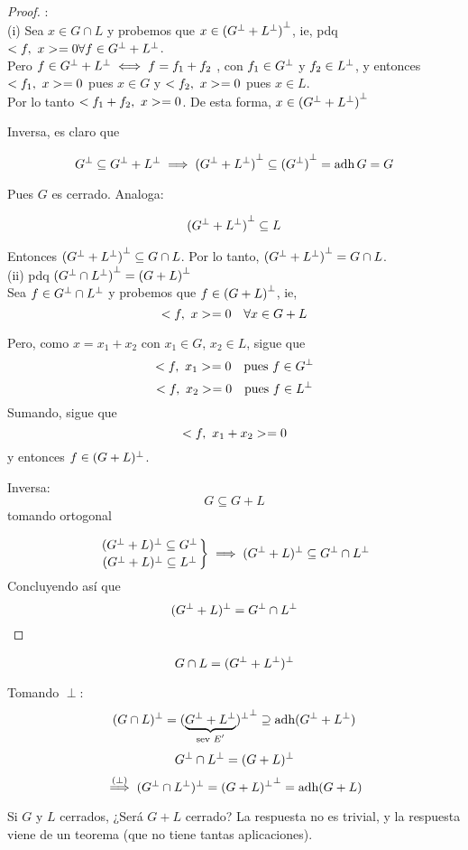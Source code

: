 \begin{proof}: \\ 
(i) Sea $x \in G \cap L$ y probemos que $x \in {(G^{\perp}+ L^{\perp})}^{\perp}$, ie, pdq $<f, \ x>_{} = 0 \forall f \in G^{\perp} + L^{\perp}$.\\ 
Pero $f \in G^{\perp} + L^{\perp} \iff f = f_1 + f_2$ , con $f_1 \in G^{\perp}$ y $f_2 \in L^{\perp}$, y entonces $<f_1, \ x>_{} = 0$ pues $x \in G$ y $<f_2, \ x>_{} = 0$ pues $x \in L$.\\
Por lo tanto $<f_1 + f_2, \ x>_{} = 0$. De esta forma, $x \in {(G^{\perp}+ L^{\perp})}^{\perp}$

Inversa\mte, es claro que

$$G^{\perp} \subseteq G^{\perp} + L^{\perp} \implies {(G^{\perp}+ L^{\perp})}^{\perp} \subseteq {(G^{\perp})}^{\perp} = \operatorname{\mathop{\text{\upshape{adh}}}} G = G$$

Pues $G$ es cerrado. Analoga\mte:

$${(G^{\perp} + L^{\perp})}^{\perp} \subseteq L $$

Entonces ${(G^{\perp} + L^{\perp})}^{\perp} \subseteq G \cap L $. Por lo tanto, ${(G^{\perp} + L^{\perp})}^{\perp} = G \cap L $. \\

(ii) pdq ${(G^{\perp} \cap L^{\perp})}^{\perp} = {(G + L)}^{\perp}$\\
Sea $f \in G^{\perp} \cap L^{\perp}$ y probemos que $f \in {(G + L)}^{\perp}$, ie, $$ <f, \ x>_{} = 0 \quad \forall x \in G + L $$

Pero, como $x = x_1 + x_2$ con $ x_1 \in G $, $ x_2 \in L $, sigue que $$ <f, \ x_1>_{} = 0 \quad \text{pues $f\in G^{\perp}$}$$ $$ <f, \ x_2>_{} = 0 \quad \text{pues $f\in L^{\perp}$}$$ Sumando, sigue que $$ <f, \ x_1 + x_2>_{} = 0 $$ y entonces $f \in (G + L)^{\perp}$.

Inversa\mte: 
$$ G \subseteq G + L $$ tomando ortogonal 

$$\left. 
(G^{\perp} + L)^{\perp} \subseteq G^{\perp} \atop
 (G^{\perp} + L)^{\perp} \subseteq L^{\perp} 
 \right\} 
 \implies 
 (G^{\perp} + L)^{\perp} \subseteq G^{\perp} \cap L^{\perp} $$
 Concluyendo así que
 $$(G^{\perp} + L)^{\perp} = G^{\perp} \cap L^{\perp} $$
\end{proof}

$$G \cap L = (G^{\perp} + L^{\perp})^{\perp}$$

Tomando $\perp$: $$(G \cap L)^{\perp} = {(
\underbrace{ G^{\perp} + L^{\perp}}_{\text{sev $E'$}}
)^{\perp}}^{\perp}
\supseteq \operatorname{\mathop{\text{\upshape{adh}}}} (G^{\perp} + L^{\perp})$$
$$ G^{\perp} \cap L^{\perp} = (G + L)^{\perp} $$
$$\overset{(\perp)}{\implies} (G^{\perp} \cap L^{\perp})^{\perp} = {(G + L)^{\perp}}^{\perp} = \operatorname{\mathop{\text{\upshape{adh}}}} (G + L)$$

Si $G$ y $L$ cerrados, ¿Será $G + L$ cerrado? La respuesta no es trivial, y la respuesta viene de un teorema (que no tiene tantas aplicaciones).

